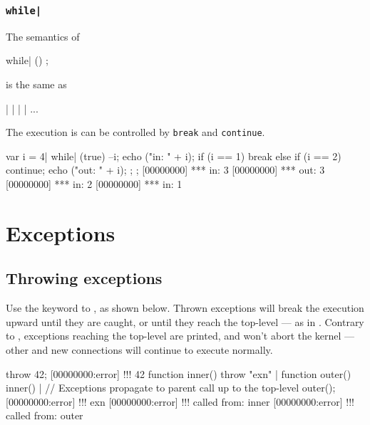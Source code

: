\subsubsection{\lstinline{while|}}

The semantics of

\begin{urbiunchecked}
while| ()
  ;
\end{urbiunchecked}

\noindent
is the same as

\begin{urbiunchecked}
 |  |  |  | ...
\end{urbiunchecked}

The execution is can be controlled by \lstinline{break} and
\lstinline{continue}.

\begin{urbiscript}
{
  var i = 4|
  while| (true)
  {
    --i;
    echo ("in: " + i);
    if (i == 1)
      break
    else if (i == 2)
      continue;
    echo ("out: " + i);
  };
};
[00000000] *** in: 3
[00000000] *** out: 3
[00000000] *** in: 2
[00000000] *** in: 1
\end{urbiscript}


\section{Exceptions}
\label{sec:lang:except}
\subsection{Throwing exceptions}
\label{sec:lang:throw}

Use the  keyword to , as shown below. Thrown exceptions will break the execution
upward until they are caught, or until they reach the top-level --- as in
\Cxx.  Contrary to \Cxx, exceptions reaching the top-level are printed, and
won't abort the kernel --- other and new connections will continue to
execute normally.

\begin{urbiscript}
throw 42;
[00000000:error] !!! 42
function inner() { throw "exn" } |
function outer() { inner() }|
// Exceptions propagate to parent call up to the top-level
outer();
[00000000:error] !!! exn
[00000000:error] !!!    called from: inner
[00000000:error] !!!    called from: outer
\end{urbiscript}

